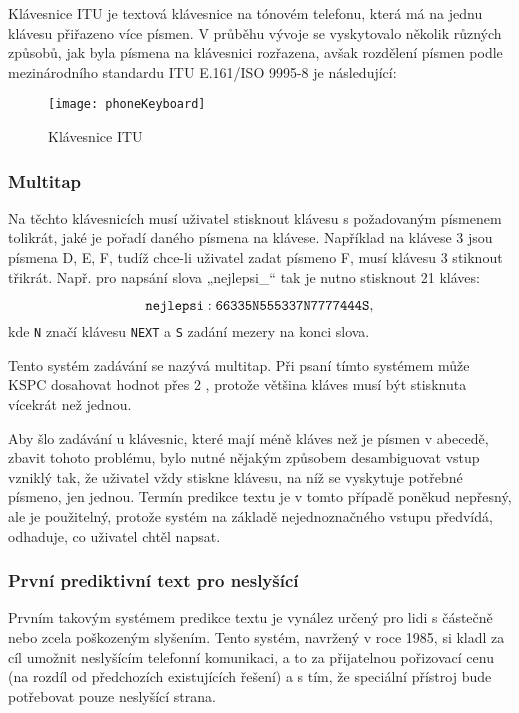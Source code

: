 \documentclass[a4paper,11pt]{article}
\begin{document}
Klávesnice ITU je textová klávesnice na tónovém telefonu, která má na jednu klávesu přiřazeno více písmen. V průběhu vývoje se vyskytovalo několik různých způsobů, jak byla písmena na klávesnici rozřazena, avšak rozdělení písmen podle mezinárodního standardu ITU E.161/ISO 9995-8 \cite{mfmtlqoxL48pMk3T} je následující: %

\begin{figure}[h]
	\label{fig:phoneKeyboard}
	\centering
	\texttt{[image: phoneKeyboard]}
	\caption{Klávesnice ITU}
\end{figure}

\subsubsection{Multitap}

Na těchto klávesnicích musí uživatel stisknout klávesu s požadovaným písmenem tolikrát, jaké je pořadí daného písmena na klávese. Například na klávese 3 jsou písmena D, E, F, tudíž chce-li uživatel zadat písmeno F, musí klávesu 3 stiknout třikrát. Např. pro napsání slova „nejlepsi\_“ tak je nutno stisknout 21 kláves:

\[
	{\tt nejlepsi: 66335N555337N7777444S},
\]
kde {\tt N} značí klávesu {\tt NEXT} a {\tt S} zadání mezery na konci slova.

Tento systém zadávání se nazývá multitap. Při psaní tímto systémem může KSPC dosahovat hodnot přes 2 \cite{dXVv6nPb2KifFXYv}, protože většina kláves musí být stisknuta vícekrát než jednou. 

Aby šlo zadávání u klávesnic, které mají méně kláves než je písmen v abecedě, zbavit tohoto problému, bylo nutné nějakým způsobem desambiguovat vstup vzniklý tak, že uživatel vždy stiskne klávesu, na níž se vyskytuje potřebné písmeno, jen jednou. Termín predikce textu je v tomto případě poněkud nepřesný, ale je použitelný, protože systém na základě nejednoznačného vstupu předvídá, odhaduje, co uživatel chtěl napsat.

\subsubsection{První prediktivní text pro neslyšící}

Prvním takovým systémem predikce textu je vynález určený pro lidi s částečně nebo zcela poškozeným slyšením. Tento systém, navržený v roce 1985, si kladl za cíl umožnit neslyšícím telefonní komunikaci, a to za přijatelnou pořizovací cenu (na rozdíl od předchozích existujících řešení) a s tím, že speciální přístroj bude potřebovat pouze neslyšící strana. \cite{Feinson1988}
\end{document}
